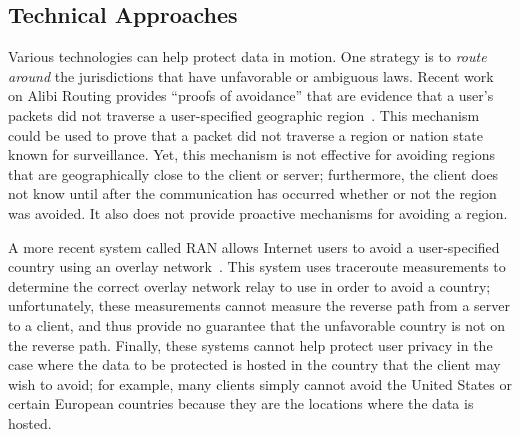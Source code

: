 \subsection{Technical Approaches}
\label{sec:tech_motion}


Various technologies can help protect data in motion.  One strategy is to {\em
route around} the jurisdictions that have unfavorable or ambiguous laws.
Recent work on Alibi Routing provides ``proofs of avoidance'' that are evidence
that a user's packets did not traverse a user-specified geographic
region~\cite{levin2015alibi}.   This mechanism could be used to prove that a
packet did not traverse a region or nation state known for surveillance. Yet,
this mechanism is not effective for avoiding regions that are 
geographically close to the client or server; furthermore,  the client does
not know until after the communication has occurred whether or not the region
was avoided. It also does not provide proactive mechanisms for avoiding a
region. 

A more recent system called RAN allows  Internet users to avoid a
user-specified country using an overlay network~\cite{edmundson2017ran}.  This
system uses traceroute measurements to determine the correct overlay network
relay to use in order to avoid a country; unfortunately, these measurements
cannot measure the reverse path from a server to a client, and thus provide no
guarantee that the unfavorable country is not on the reverse path. Finally, these
systems cannot help protect user privacy in the case where the data to be protected
is hosted in the country that the client may wish to avoid; for example, many clients
simply cannot avoid the United States or certain European countries because they
are the locations where the data is hosted.

